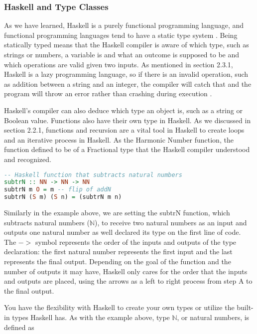 \documentclass{article}
\begin{document}
\subsubsection{Haskell and Type Classes}

As we have learned, Haskell is a purely functional programming language, and functional programming languages tend to have a static type system \cite{LYH Types}. Being statically typed means that the Haskell compiler is aware of which type, such as strings or numbers, a variable is and what an outcome is supposed to be and which operations are valid given two inputs. As mentioned in section 2.3.1, Haskell is a lazy programming language, so if there is an invalid operation, such as addition between a string and an integer, the compiler will catch that and the program will throw an error rather than crashing during execution \cite{LYH Types}. 

\medskip\noindent
Haskell's compiler can also deduce which type an object is, such as a string or Boolean value. Functions also have their own type in Haskell. As we discussed in section 2.2.1, functions and recursion are a vital tool in Haskell to create loops and an iterative process in Haskell. As the Harmonic Number function, the function defined to be of a Fractional type that the Haskell compiler understood and recognized.  

\begin{lstlisting}[language=haskell]
-- Haskell function that subtracts natural numbers
subtrN :: NN -> NN -> NN
subtrN m O = m -- flip of addN
subtrN (S m) (S n) = (subtrN m n) 
\end{lstlisting}

\noindent
Similarly in the example above, we are setting the subtrN function, which subtracts natural numbers ($\mathbb N$), to receive two natural numbers as an input and outputs one natural number as well declared its type on the first line of code. The $->$ symbol represents the order of the inputs and outputs of the type declaration: the first natural number represents the first input and the last represents the final output. Depending on the goal of the function and the number of outputs it may have, Haskell only cares for the order that the inputs and outputs are placed, using the arrows as a left to right process from step A to the final output.

\medskip\noindent
You have the flexibility with Haskell to create your own types or utilize the built-in types Haskell has. As with the example above, type $\mathbb N$, or natural numbers, is defined as
\end{document}
